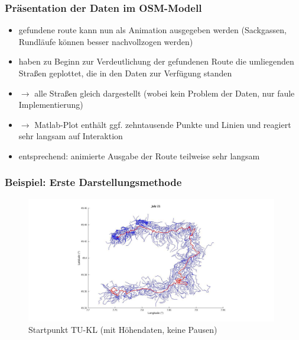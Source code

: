 \documentclass[aspectratio=43]{beamer}
\begin{document}
\begin{frame}
    \frametitle{Präsentation der Daten im OSM-Modell}
    \begin{itemize}
        \item gefundene route kann nun als Animation ausgegeben werden (Sackgassen,
            Rundläufe können besser nachvollzogen werden)
        \item haben zu Beginn zur Verdeutlichung der gefundenen Route die umliegenden
            Straßen geplottet, die in den Daten zur Verfügung standen
        \item[] $\rightarrow$ alle Straßen gleich dargestellt (wobei kein Problem der
            Daten, nur faule Implementierung)
        \item[] $\rightarrow$ Matlab-Plot enthält ggf. zehntausende Punkte und Linien und
            reagiert sehr langsam auf Interaktion
        \item entsprechend: animierte Ausgabe der Route teilweise sehr langsam
    \end{itemize}
\end{frame}

\begin{frame}
    \frametitle{Beispiel: Erste Darstellungsmethode}
    \begin{figure}[t]
        \centering
        \includegraphics[width=0.98\textwidth]{bilder/lineele.jpg}
        \caption{Startpunkt TU-KL (mit Höhendaten, keine Pausen)}
    \end{figure}
\end{frame}
\end{document}
